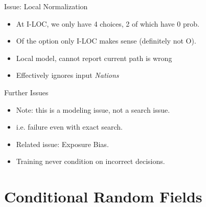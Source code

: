 \documentclass{beamer}
\def\LatticeB{
    \matrix (network)
    [matrix of nodes,
    nodes in empty cells,
    ampersand replacement=\&,
    column sep={1cm},
    row sep={0.1cm},
    nodes={outer sep=0pt,circle,minimum size=0.5cm, minimum width=1.3cm,draw, rectangle} ]
    {
     O \& O \& O \& O \& O\\
     I-PER \& I-PER \& I-PER \& I-PER \& I-PER \\ 
     I-ORG \& I-ORG \& I-ORG \& I-ORG \& I-ORG \\ 
     I-LOC \& I-LOC \& I-LOC \& I-LOC \& I-LOC \\ 
     |[draw=none]| \\
     |[draw=none]| The \& |[draw=none]| United \& |[draw=none]| Nations \& |[draw=none]| will  \& |[draw=none]| meet  \\  
};
}
\begin{document}
\begin{frame}{Issue: Local Normalization}
  \begin{itemize}
  \item At I-LOC, we only have 4 choices, 2 of which have 0 prob. 
  \item Of the option only I-LOC makes sense (definitely not O). 
  \item Local model, cannot report current path is \alert{wrong}
  \item Effectively ignores input \textit{Nations}
  \end{itemize}
\end{frame}


\begin{frame}{Further Issues}
  \begin{itemize}
  \item Note: this is a modeling issue, not a search issue. 
    \air 
  \item i.e. failure even with exact search.
    \air 

  \item Related issue: Exposure Bias. 
    \air 
  \item Training never condition on incorrect decisions.
  \end{itemize}
\end{frame}

\section{Conditional Random Fields}
\end{document}
